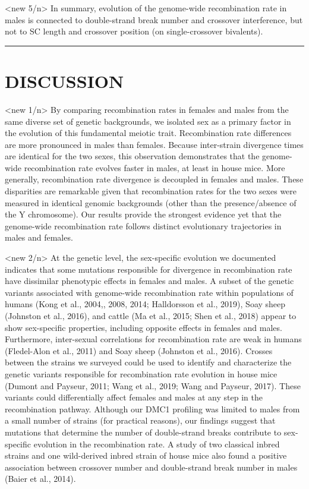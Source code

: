 \documentclass[
]{article}
\begin{document}
\textless new 5/n\textgreater{} In summary, evolution of the genome-wide
recombination rate in males is connected to double-strand break number
and crossover interference, but not to SC length and crossover position
(on single-crossover bivalents).

\begin{center}\rule{0.5\linewidth}{0.5pt}\end{center}

\hypertarget{discussion}{%
\section{DISCUSSION}\label{discussion}}

\textless new 1/n\textgreater{} By comparing recombination rates in
females and males from the same diverse set of genetic backgrounds, we
isolated sex as a primary factor in the evolution of this fundamental
meiotic trait. Recombination rate differences are more pronounced in
males than females. Because inter-strain divergence times are identical
for the two sexes, this observation demonstrates that the genome-wide
recombination rate evolves faster in males, at least in house mice. More
generally, recombination rate divergence is decoupled in females and
males. These disparities are remarkable given that recombination rates
for the two sexes were measured in identical genomic backgrounds (other
than the presence/absence of the Y chromosome). Our results provide the
strongest evidence yet that the genome-wide recombination rate follows
distinct evolutionary trajectories in males and females.

\textless new 2/n\textgreater{} At the genetic level, the sex-specific
evolution we documented indicates that some mutations responsible for
divergence in recombination rate have dissimilar phenotypic effects in
females and males. A subset of the genetic variants associated with
genome-wide recombination rate within populations of humans (Kong et
al., 2004,, 2008, 2014; Halldorsson et al., 2019), Soay sheep (Johnston
et al., 2016), and cattle (Ma et al., 2015; Shen et al., 2018) appear to
show sex-specific properties, including opposite effects in females and
males. Furthermore, inter-sexual correlations for recombination rate are
weak in humans (Fledel-Alon et al., 2011) and Soay sheep (Johnston et
al., 2016). Crosses between the strains we surveyed could be used to
identify and characterize the genetic variants responsible for
recombination rate evolution in house mice (Dumont and Payseur, 2011;
Wang et al., 2019; Wang and Payseur, 2017). These variants could
differentially affect females and males at any step in the recombination
pathway. Although our DMC1 profiling was limited to males from a small
number of strains (for practical reasons), our findings suggest that
mutations that determine the number of double-strand breaks contribute
to sex-specific evolution in the recombination rate. A study of two
classical inbred strains and one wild-derived inbred strain of house
mice also found a positive association between crossover number and
double-strand break number in males (Baier et al., 2014).
\end{document}
